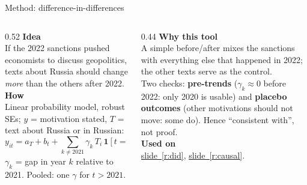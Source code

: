 \documentclass[aspectratio=169,10pt]{beamer}
\newcommand{\usedon}[1]{\hyperref[#1]{\textcolor{c4}{slide~\ref*{#1}}}}
\newcommand{\mhead}[1]{\textcolor{c1}{\textbf{#1}}\\[1pt]}
\begin{document}
\begin{frame}{Method: difference-in-differences}
\begin{columns}[T]
\begin{column}{0.52\textwidth}\footnotesize
\mhead{Idea}
If the 2022 sanctions pushed economists to discuss geopolitics, texts about Russia should change \emph{more} than the others after 2022.\\[4pt]
\mhead{How}
Linear probability model, robust SEs; $y$ = motivation stated, $T$ = text about Russia or in Russian:
\[ y_{it} = a_T + b_t + \sum_{k\neq 2021} \gamma_k\, T_i\,\mathbf{1}[t=k] + \varepsilon_{it} \]
$\gamma_k$ = gap in year $k$ relative to 2021. Pooled: one $\gamma$ for $t > 2021$.
\end{column}
\begin{column}{0.44\textwidth}\footnotesize
\mhead{Why this tool}
A simple before/after mixes the sanctions with everything else that happened in 2022; the other texts serve as the control.\\[3pt]
Two checks: \textbf{pre-trends} ($\gamma_k \approx 0$ before 2022: only 2020 is usable) and \textbf{placebo outcomes} (other motivations should not move: some do). Hence ``consistent with'', not proof.\\[6pt]
\mhead{Used on}
\usedon{r:did}, \usedon{r:causal}.
\end{column}
\end{columns}
\end{frame}
\end{document}
